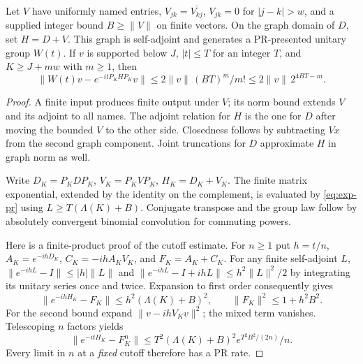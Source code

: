 \begin{theorem}\label{thm:band-dynamics}
Let $V$ have uniformly named entries, $V_{jk}=\overline{V_{kj}}$,
$V_{jk}=0$ for $|j-k|>w$, and a supplied integer bound $B\ge\|V\|$
on finite vectors. On the graph domain of $D$, set $H=D+V$.
This graph is self-adjoint and generates a PR-presented unitary group
$W(t)$. If $v$ is supported below $J$, $|t|\le T$ for an integer $T$,
and $K\ge J+mw$ with $m\ge1$, then
\begin{equation}\label{eq:galerkin}
 \|W(t)v-e^{-itP_KHP_K}v\|
 \le 2\|v\|\,(BT)^m/m!\le2\|v\|\,2^{4BT-m}.
\end{equation}
\end{theorem}
\begin{proof}
A finite input produces finite output under $V$; its norm bound extends
$V$ and its adjoint to all names. The adjoint relation for $H$ is the
one for $D$ after moving the bounded $V$ to the other side. Closedness
follows by subtracting $Vx$ from the second graph component. Joint
truncations for $D$ approximate $H$ in graph norm as well.

Write $D_K=P_KDP_K$, $V_K=P_KVP_K$, $H_K=D_K+V_K$.
The finite matrix exponential, extended by the identity on the
complement, is evaluated by \eqref{eq:exp-pr} using
$L\ge T(\Lambda(K)+B)$. Conjugate transpose and the group law follow by
absolutely convergent binomial convolution for commuting powers.

Here is a finite-product proof of the cutoff estimate. For $n\ge1$
put $h=t/n$, $A_K=e^{-ihD_K}$, $C_K=-ihA_KV_K$, and $F_K=A_K+C_K$.
For any finite self-adjoint $L$,
$\|e^{-ihL}-I\|\le |h|\|L\|$ and
$\|e^{-ihL}-I+ihL\|\le h^2\|L\|^2/2$ by integrating its unitary
series once and twice. Expansion to first order consequently gives
\[
 \|e^{-ihH_K}-F_K\|\le h^2(\Lambda(K)+B)^2,\qquad
 \|F_K\|^2\le1+h^2 B^2 .
\]
For the second bound expand $\|v-ihV_Kv\|^2$; the mixed term vanishes.
Telescoping $n$ factors yields
\[
 \|e^{-itH_K}-F_K^n\|
 \le T^2(\Lambda(K)+B)^2 e^{T^2 B^2/(2n)}/n.
\]
Every limit in $n$ at a \emph{fixed} cutoff therefore has a PR rate.


\end{proof}
